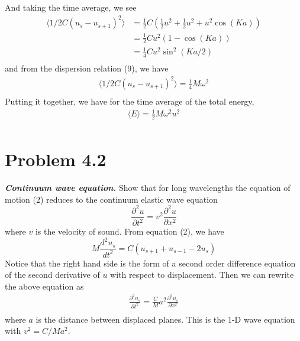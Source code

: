 \documentclass{article}
\begin{document}
And taking the time average, we see
\begin{align*}
    \langle 1/2C(u_s - u_{s+1})^2 \rangle &= \frac{1}{2}C\left(\frac{1}{2}u^2 + \frac{1}{2}u^2 + u^2\cos{(Ka)}\right) \\
    &= \frac{1}{2}Cu^2(1 - \cos{(Ka)}) \\
    &= \frac{1}{4}Cu^2\sin^2{(Ka/2)} \\
\end{align*}
and from the dispersion relation (9), we have
\begin{align*}
    \langle 1/2C(u_s - u_{s+1})^2 \rangle = \frac{1}{4}M\omega^2 \\
\end{align*}
Putting it together, we have for the time average of the total energy,
\begin{align*}
    \langle E \rangle = \frac{1}{2}M\omega^2u^2 \\
\end{align*}

\section*{Problem 4.2}
\textit{\textbf{Continuum wave equation.}} Show that for long wavelengths the equation of motion (2) reduces to the continuum elastic wave equation
\[\frac{\partial^2 u}{\partial t^2} = v^2\frac{\partial^2u}{\partial x^2}\]
where $v$ is the velocity of sound.
\newline\newline
From equation (2), we have
\[M\frac{d^2u_s}{dt^2} = C(u_{s+1} + u_{s-1} - 2u_s)\]
Notice that the right hand side is the form of a second order difference equation of the second derivative of $u$ with respect to displacement. Then we can rewrite the above equation as
\begin{align*}
    \frac{\partial^2u_s}{\partial t^2} = \frac{C}{M}a^2\frac{\partial^2u_s}{\partial x^2} \\
\end{align*}
where $a$ is the distance between displaced planes. This is the 1-D wave equation with $v^2 = C/Ma^2$.
\end{document}
